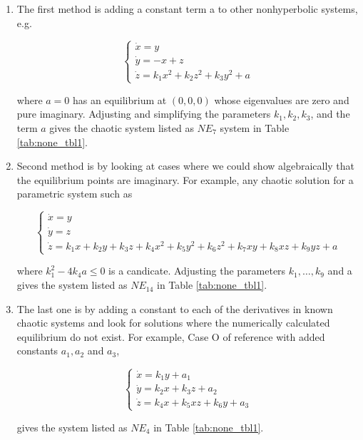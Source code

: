 \begin{enumerate}
\item The first method is adding a constant term a to other nonhyperbolic systems, e.g.

  \begin{equation}
    \left\{
    \begin{array}{l}
      \dot{x} = y \\
      \dot{y} = -x+z \\
      \dot{z} = k_1x^2+k_2z^2+k_3y^2+a 
    \end{array}
    \right.
  \end{equation}

  where \(a=0\) has an equilibrium at \((0,0,0)\) whose eigenvalues are zero and
  pure imaginary. Adjusting and simplifying the parameters
  \(k_1, k_2, k_3\), and the term $a$ gives the chaotic system listed
  as \(NE_7\) system in Table \ref{tab:none_tbl1}.

\item Second method is by looking at cases where we could show algebraically that the equilibrium
  points are imaginary. For example, any chaotic solution for a
  parametric system such as

\begin{equation}
  \left\{
    \begin{array}{l}
      \dot{x} = y \\
      \dot{y} = z \\
      \dot{z} = k_1x+k_2y+k_3z+k_4x^2+k_5y^2+k_6z^2+k_7xy+k_8xz+k_9yz+a
    \end{array}
  \right.
\end{equation}

where \(k_1^2 - 4k_4a \leq 0\) is a candicate. Adjusting the parameters \(k_1,\ldots,k_9\) and a gives the system listed as \(NE_{14}\)
in Table \ref{tab:none_tbl1}.

\item The last one is by adding a constant to each of the derivatives in known chaotic systems
  and look for solutions where the 
  numerically calculated equilibrium do not exist. For example, Case O of reference \cite{Sprott1994Some} with added constants \(a_1, a_2\) and \(a_3\),

\begin{equation}
  \left\{
    \begin{array}{l}
      \dot{x} = k_1y+a_1\\
      \dot{y} = k_2x+k_3z+a_2 \\
      \dot{z} = k_4x+k_5xz+k_6y+a_3
    \end{array}
  \right.
\end{equation}

gives the system listed as \(NE_4\) in Table \ref{tab:none_tbl1}.
\end{enumerate}

